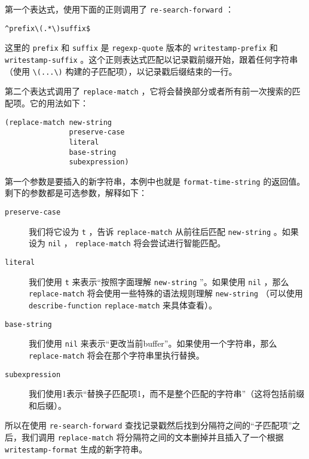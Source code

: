 第一个表达式，使用下面的正则调用了 \texttt{re-search-forward} ：

\begin{verbatim}
^prefix\(.*\)suffix$
\end{verbatim}

这里的 \texttt{prefix} 和 \texttt{suffix} 是 \texttt{regexp-quote} 版本的 \texttt{writestamp-prefix} 和 \texttt{writestamp-suffix} 。这个正则表达式匹配以记录戳前缀开始，跟着任何字符串（使用 \verb|\(...\)| 构建的子匹配项），以记录戳后缀结束的一行。

第二个表达式调用了 \texttt{replace-match} ，它将会替换部分或者所有前一次搜索的匹配项。它的用法如下：

\begin{verbatim}
(replace-match new-string
               preserve-case
               literal
               base-string
               subexpression)
\end{verbatim}

第一个参数是要插入的新字符串，本例中也就是 \texttt{format-time-string} 的返回值。剩下的参数都是可选参数，解释如下：

\begin{description}
  \item [ \texttt{preserve-case} ] 我们将它设为 \texttt{t} ，告诉 \texttt{replace-match} 从前往后匹配 \texttt{new-string} 。如果设为 \texttt{nil} ， \texttt{replace-match} 将会尝试进行智能匹配。
  \item[ \texttt{literal} ] 我们使用 \texttt{t} 来表示“按照字面理解 \texttt{new-string} ”。如果使用 \texttt{nil} ，那么 \texttt{replace-match} 将会使用一些特殊的语法规则理解 \texttt{new-string} （可以使用 \texttt{describe-function} \texttt{replace-match} 来具体查看）。
  \item[ \texttt{base-string} ] 我们使用 \texttt{nil} 来表示“更改当前buffer”。如果使用一个字符串，那么 \texttt{replace-match} 将会在那个字符串里执行替换。
  \item[ \texttt{subexpression} ] 我们使用1表示“替换子匹配项1，而不是整个匹配的字符串”（这将包括前缀和后缀）。
\end{description}

所以在使用 \texttt{re-search-forward} 查找记录戳然后找到分隔符之间的“子匹配项”之后，我们调用 \texttt{replace-match} 将分隔符之间的文本删掉并且插入了一个根据 \texttt{writestamp-format} 生成的新字符串。

